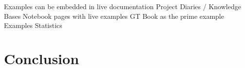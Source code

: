 \documentclass[sigplan,anonymous,review,10pt]{acmart}
\begin{document}
	
		Examples can be embedded in live documentation
		Project Diaries / Knowledge Bases
			Notebook pages with live examples
		GT Book as the prime example
			Examples
			Statistics


\section{Conclusion}\label{sec:conclusion}





\end{document}
